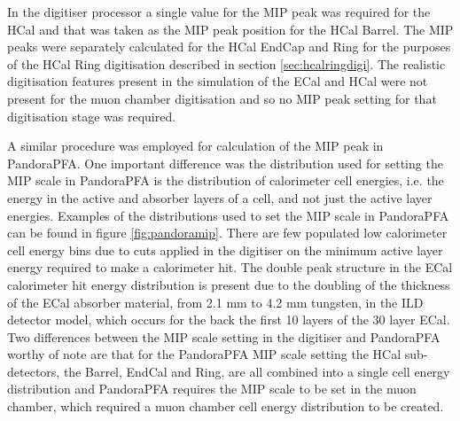 In the digitiser processor a single value for the MIP peak was required for the HCal and that was taken as the MIP peak position for the HCal Barrel.  The MIP peaks were separately calculated for the HCal EndCap and Ring for the purposes of the HCal Ring digitisation described in section \ref{sec:hcalringdigi}.  The realistic digitisation features present in the simulation of the ECal and HCal were not present for the muon chamber digitisation and so no MIP peak setting for that digitisation stage was required.

A similar procedure was employed for calculation of the MIP peak in PandoraPFA.  One important difference was the distribution used for setting the MIP scale in PandoraPFA is the distribution of calorimeter cell energies, i.e. the energy in the active and absorber layers of a cell, and not just the active layer energies.  Examples of the distributions used to set the MIP scale in PandoraPFA can be found in figure \ref{fig:pandoramip}.  There are few populated low calorimeter cell energy bins due to cuts applied in the digitiser on the minimum active layer energy required to make a calorimeter hit.  The double peak structure in the ECal calorimeter hit energy distribution is present due to the doubling of the thickness of the ECal absorber material, from 2.1 mm to 4.2 mm tungsten, in the ILD detector model, which occurs for the back the first 10 layers of the 30 layer ECal.  Two differences between the MIP scale setting in the digitiser and PandoraPFA worthy of note are that for the PandoraPFA MIP scale setting the HCal sub-detectors, the Barrel, EndCal and Ring, are all combined into a single cell energy distribution and PandoraPFA requires the MIP scale to be set in the muon chamber, which required a muon chamber cell energy distribution to be created.  

